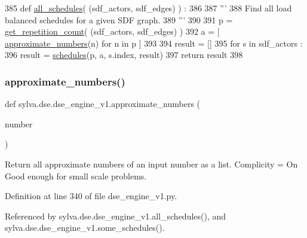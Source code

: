 \begin{DoxyCode}
385 \textcolor{keyword}{def }\hyperlink{namespacesylva_1_1dse_1_1dse__engine__v1_a8ca06c203c74d5cd06866a67203d251c}{all\_schedules}( (sdf\_actors, sdf\_edges) ) :
386 
387   \textcolor{stringliteral}{'''}
388 \textcolor{stringliteral}{    Find all load balanced schedules for a given SDF graph.}
389 \textcolor{stringliteral}{  '''}
390 
391   p = \hyperlink{namespacesylva_1_1base_1_1sdf__to__hsdf_a9c5d04cd8f0b409b56239871067f50d5}{get\_repetition\_count}( (sdf\_actors, sdf\_edges) )
392   a = [ \hyperlink{namespacesylva_1_1dse_1_1dse__engine__v1_ad6e97d4396aee376d84b0ce79ba7fd22}{approximate\_numbers}(n) \textcolor{keywordflow}{for} n \textcolor{keywordflow}{in} p ]
393 
394   result = []
395   \textcolor{keywordflow}{for} s \textcolor{keywordflow}{in} sdf\_actors :
396     result = \hyperlink{namespacesylva_1_1dse_1_1dse__engine__v1_a9f62832c5ef72269c1920b61d0eeb2a6}{schedules}(p, a, s.index, result)
397   \textcolor{keywordflow}{return} result
398 
\end{DoxyCode}
\mbox{\label{namespacesylva_1_1dse_1_1dse__engine__v1_ad6e97d4396aee376d84b0ce79ba7fd22}} 
\subsubsection{\texorpdfstring{approximate\+\_\+numbers()}{approximate\_numbers()}}
{\footnotesize\ttfamily def sylva.\+dse.\+dse\+\_\+engine\+\_\+v1.\+approximate\+\_\+numbers (\begin{DoxyParamCaption}\item[{}]{number }\end{DoxyParamCaption})}

\begin{DoxyVerb}  Return all approximate numbers of an input number as a list.
  Complicity = O{n}
  Good enough for small scale problems.
\end{DoxyVerb}
 

Definition at line 340 of file dse\+\_\+engine\+\_\+v1.\+py.



Referenced by sylva.\+dse.\+dse\+\_\+engine\+\_\+v1.\+all\+\_\+schedules(), and sylva.\+dse.\+dse\+\_\+engine\+\_\+v1.\+some\+\_\+schedules().


